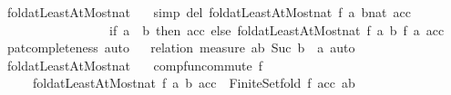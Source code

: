 \begin{isabellebody}
%
\endisatagproof
{\isafoldproof}%
%
\isadelimproof
%
\endisadelimproof
%
\isadelimdocument
%
\endisadelimdocument
%
\isatagdocument
%
\isamarkuptrue%
%
\endisatagdocument
{\isafolddocument}%
%
\isadelimdocument
%
\endisadelimdocument
{}\isamarkupfalse%
\ fold{\isacharunderscore}{\kern0pt}atLeastAtMost{\isacharunderscore}{\kern0pt}nat\ \isanewline
\ \ {\isacharbrackleft}{\kern0pt}simp\ del{\isacharbrackright}{\kern0pt}{\isacharcolon}{\kern0pt}\ {\isachardoublequoteopen}fold{\isacharunderscore}{\kern0pt}atLeastAtMost{\isacharunderscore}{\kern0pt}nat\ f\ a\ {\isacharparenleft}{\kern0pt}b{\isacharcolon}{\kern0pt}{\isacharcolon}{\kern0pt}nat{\isacharparenright}{\kern0pt}\ acc\ {\isacharequal}{\kern0pt}\isanewline
\ \ \ \ \ \ \ \ \ \ \ \ \ \ \ \ \ {\isacharparenleft}{\kern0pt}if\ a\ {\isachargreater}{\kern0pt}\ b\ then\ acc\ else\ fold{\isacharunderscore}{\kern0pt}atLeastAtMost{\isacharunderscore}{\kern0pt}nat\ f\ {\isacharparenleft}{\kern0pt}a{\isacharplus}{\kern0pt}{}{\isacharparenright}{\kern0pt}\ b\ {\isacharparenleft}{\kern0pt}f\ a\ acc{\isacharparenright}{\kern0pt}{\isacharparenright}{\kern0pt}{\isachardoublequoteclose}\isanewline
%
\isadelimproof
%
\endisadelimproof
%
\isatagproof
{}\isamarkupfalse%
\ pat{\isacharunderscore}{\kern0pt}completeness\ auto%
\endisatagproof
{\isafoldproof}%
%
\isadelimproof
\isanewline
%
\endisadelimproof
{}\isamarkupfalse%
%
\isadelimproof
\ %
\endisadelimproof
%
\isatagproof
{}\isamarkupfalse%
\ {\isacharparenleft}{\kern0pt}relation\ {\isachardoublequoteopen}measure\ {\isacharparenleft}{\kern0pt}{\isasymlambda}{\isacharparenleft}{\kern0pt}{\isacharunderscore}{\kern0pt}{\isacharcomma}{\kern0pt}a{\isacharcomma}{\kern0pt}b{\isacharcomma}{\kern0pt}{\isacharunderscore}{\kern0pt}{\isacharparenright}{\kern0pt}{\isachardot}{\kern0pt}\ Suc\ b\ {\isacharminus}{\kern0pt}\ a{\isacharparenright}{\kern0pt}{\isachardoublequoteclose}{\isacharparenright}{\kern0pt}\ auto%
\endisatagproof
{\isafoldproof}%
%
\isadelimproof
%
\endisadelimproof
\isanewline
\isanewline
{}\isamarkupfalse%
\ fold{\isacharunderscore}{\kern0pt}atLeastAtMost{\isacharunderscore}{\kern0pt}nat{\isacharcolon}{\kern0pt}\isanewline
\ \ \ {\isachardoublequoteopen}comp{\isacharunderscore}{\kern0pt}fun{\isacharunderscore}{\kern0pt}commute\ f{\isachardoublequoteclose}\isanewline
\ \ \ \ \ {\isachardoublequoteopen}fold{\isacharunderscore}{\kern0pt}atLeastAtMost{\isacharunderscore}{\kern0pt}nat\ f\ a\ b\ acc\ {\isacharequal}{\kern0pt}\ Finite{\isacharunderscore}{\kern0pt}Set{\isachardot}{\kern0pt}fold\ f\ acc\ {\isacharbraceleft}{\kern0pt}a{\isachardot}{\kern0pt}{\isachardot}{\kern0pt}b{\isacharbraceright}{\kern0pt}{\isachardoublequoteclose}\isanewline

\end{isabellebody}
